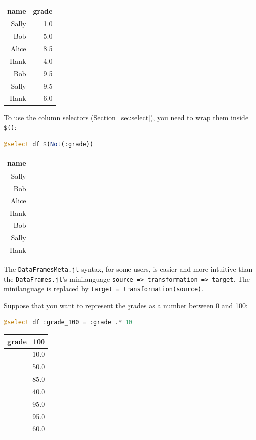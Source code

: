 \documentclass[
  notoc %
]{tufte-book}
\newcommand{\passthrough}[1]{#1}
\begin{document}
\begin{longtable}[]{@{}rr@{}}
\toprule()
name & grade \\
\midrule()
\endhead
Sally & 1.0 \\
Bob & 5.0 \\
Alice & 8.5 \\
Hank & 4.0 \\
Bob & 9.5 \\
Sally & 9.5 \\
Hank & 6.0 \\
\bottomrule()
\end{longtable}

To use the column selectors (Section~\ref{sec:select}), you need to wrap
them inside \passthrough{\lstinline!$()!}:

\begin{lstlisting}[language=Julia]
@select df $(Not(:grade))
\end{lstlisting}

\begin{longtable}[]{@{}r@{}}
\toprule()
name \\
\midrule()
\endhead
Sally \\
Bob \\
Alice \\
Hank \\
Bob \\
Sally \\
Hank \\
\bottomrule()
\end{longtable}

The \passthrough{\lstinline!DataFramesMeta.jl!} syntax, for some users,
is easier and more intuitive than the
\passthrough{\lstinline!DataFrames.jl!}'s minilanguage
\passthrough{\lstinline!source => transformation => target!}. The
minilanguage is replaced by
\passthrough{\lstinline!target = transformation(source)!}.

Suppose that you want to represent the grades as a number between 0 and
100:

\begin{lstlisting}[language=Julia]
@select df :grade_100 = :grade .* 10
\end{lstlisting}

\begin{longtable}[]{@{}r@{}}
\toprule()
grade\_100 \\
\midrule()
\endhead
10.0 \\
50.0 \\
85.0 \\
40.0 \\
95.0 \\
95.0 \\
60.0 \\
\bottomrule()
\end{longtable}
\end{document}
